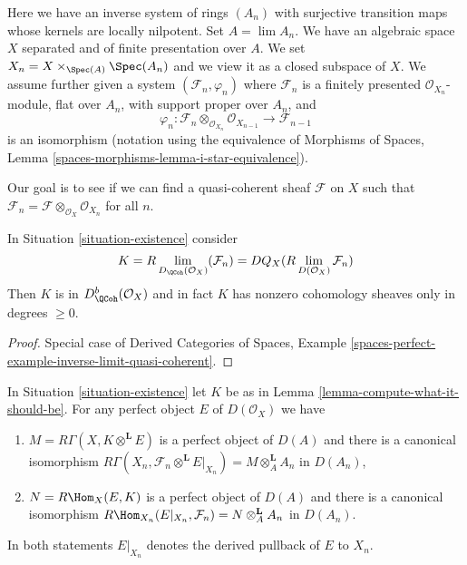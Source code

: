 \begin{situation}
\label{situation-existence}
Here we have an inverse system of rings $(A_n)$ with surjective transition
maps whose kernels are locally nilpotent. Set $A = \lim A_n$. We have an
algebraic space $X$ separated and of finite presentation over $A$.
We set $X_n = X \times_{\Spec(A)} \Spec(A_n)$ and we
view it as a closed subspace of $X$. We assume further given a system
$(\mathcal{F}_n, \varphi_n)$ where $\mathcal{F}_n$ is a finitely presented
$\mathcal{O}_{X_n}$-module, flat over $A_n$, with support proper over $A_n$,
and
$$
\varphi_n :
\mathcal{F}_n \otimes_{\mathcal{O}_{X_n}} \mathcal{O}_{X_{n - 1}}
\longrightarrow
\mathcal{F}_{n - 1}
$$
is an isomorphism (notation using the equivalence of
Morphisms of Spaces, Lemma \ref{spaces-morphisms-lemma-i-star-equivalence}).
\end{situation}

\noindent
Our goal is to see if we can find a quasi-coherent sheaf $\mathcal{F}$
on $X$ such that
$\mathcal{F}_n = \mathcal{F} \otimes_{\mathcal{O}_X} \mathcal{O}_{X_n}$
for all $n$.

\begin{lemma}
\label{lemma-compute-what-it-should-be}
In Situation \ref{situation-existence} consider
$$
K = R\lim_{D_\QCoh(\mathcal{O}_X)}(\mathcal{F}_n) =
DQ_X(R\lim_{D(\mathcal{O}_X)}\mathcal{F}_n)
$$
Then $K$ is in $D^b_{\QCoh}(\mathcal{O}_X)$ and in fact
$K$ has nonzero cohomology sheaves only in degrees $\geq 0$.
\end{lemma}

\begin{proof}
Special case of
Derived Categories of Spaces, Example
\ref{spaces-perfect-example-inverse-limit-quasi-coherent}.
\end{proof}

\begin{lemma}
\label{lemma-compute-against-perfect}
In Situation \ref{situation-existence} let $K$ be as in
Lemma \ref{lemma-compute-what-it-should-be}. For any perfect
object $E$ of $D(\mathcal{O}_X)$ we have
\begin{enumerate}
\item $M = R\Gamma(X, K \otimes^\mathbf{L} E)$ is a perfect object of $D(A)$
and there is a canonical isomorphism
$R\Gamma(X_n, \mathcal{F}_n \otimes^\mathbf{L} E|_{X_n}) =
M \otimes_A^\mathbf{L} A_n$
in $D(A_n)$,
\item $N = R\Hom_X(E, K)$ is a perfect object of $D(A)$
and there is a canonical isomorphism
$R\Hom_{X_n}(E|_{X_n}, \mathcal{F}_n) = N \otimes_A^\mathbf{L} A_n$
in $D(A_n)$.
\end{enumerate}
In both statements $E|_{X_n}$ denotes the derived pullback
of $E$ to $X_n$.
\end{lemma}

